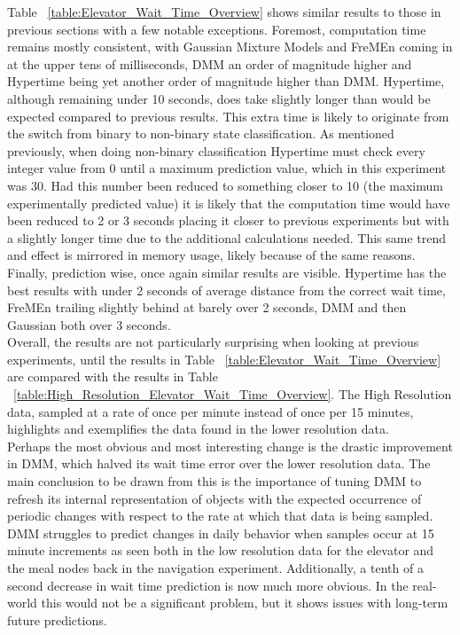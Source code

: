 \begin{center}
\begin{center}
Table ~\ref{table:Elevator_Wait_Time_Overview} shows similar results to those
in previous sections with a few notable exceptions. Foremost, computation time
remains mostly consistent, with Gaussian Mixture Models and FreMEn coming in at
the upper tens of milliseconds, DMM an order of magnitude higher and
Hypertime being yet another order of magnitude higher than DMM. Hypertime,
although remaining under 10 seconds, does take slightly longer than would
be expected compared to previous results. This extra time is likely to originate
from the switch from binary to non-binary state classification. As mentioned previously,
when doing non-binary classification Hypertime must check every integer value
from 0 until a maximum prediction value, which in this experiment was 30. Had this
number been reduced to something closer to 10 (the maximum experimentally
predicted value) it is likely that the computation time would have been reduced to
2 or 3 seconds placing it closer to previous
experiments but with a slightly longer time due to the additional calculations
needed. This same trend and effect is mirrored in memory usage, likely because of the same reasons.
Finally, prediction wise, once again
similar results are visible. Hypertime has the best results with under 2
seconds of average distance from the correct wait time, FreMEn
trailing slightly behind at barely over 2 seconds, DMM and then Gaussian both over 3 seconds. \\

Overall, the results are not particularly surprising when looking at previous
experiments, until the results in Table
~\ref{table:Elevator_Wait_Time_Overview} are compared with the results in Table
~\ref{table:High_Resolution_Elevator_Wait_Time_Overview}. The High Resolution
data, sampled at a rate of once per minute instead of once per 15 minutes,
highlights and exemplifies the data found in the lower resolution data. \\

Perhaps the most obvious and most interesting change is the drastic improvement
in DMM, which halved its wait time error over the lower resolution data.
The main conclusion to be drawn from this is the importance of tuning DMM
to refresh its internal representation of objects with the expected occurrence
of periodic changes with respect to the rate at which that data is being
sampled. DMM struggles to predict changes in daily behavior when samples
occur at 15 minute increments as seen both in the low resolution data for the
elevator and the meal nodes back in the navigation experiment.
Additionally, a tenth of a second decrease in wait time prediction is now much more obvious.
In the real-world this would not be a significant problem,
but it shows issues with long-term future predictions. \\


\end{center}
\end{center}
